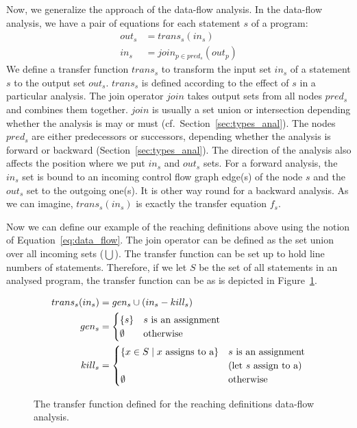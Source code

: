 Now, we generalize the approach of the data-flow analysis. In the data-flow
analysis, we have a pair of equations for each statement $s$ of a program:
\begin{equation} \label{eq:data_flow}
\begin{aligned}
out_s & = trans_s(in_s) \\
in_s & = join_{p\in pred_s}(out_p)
\end{aligned}
\end{equation}
We define a transfer function $trans_s$ to transform the input set $in_s$ of a
statement $s$ to the output set $out_s$. $trans_s$ is defined according to the
effect of $s$ in a particular analysis.  The join operator $join$ takes output
sets from all nodes $pred_s$ and combines them together. $join$ is usually a
set union or intersection depending whether the analysis is may or must (cf.\
Section~\ref{sec:types_anal}). The nodes $pred_s$ are either predecessors or
successors, depending whether the analysis is forward or backward
(Section~\ref{sec:types_anal}).  The direction of the analysis also affects
the position where we put $in_s$ and $out_s$ sets. For a forward analysis, the
$in_s$ set is bound to an incoming control flow graph edge(s) of the node $s$
and the $out_s$ set to the outgoing one(s). It is other way round for a
backward analysis. As we can imagine, $trans_s(in_s)$ is exactly the transfer
equation $f_s$.

Now we can define our example of the reaching definitions above using the
notion of Equation~\ref{eq:data_flow}. The join operator can be defined as the
set union over all incoming sets ($\bigcup$). The transfer function can be set
up to hold line numbers of statements. Therefore, if we let $S$ be the set of
all statements in an analysed program, the transfer function can be as is
depicted in Figure~\ref{fig:st_rdef_trans}.

\begin{figure}[tb]
\begin{align*}
trans_s(in_s) & = gen_s \cup (in_s - kill_s) \\
gen_s & =
\begin{cases}
\{s\}     & \text{$s$ is an assignment} \\
\emptyset & \text{otherwise}
\end{cases} \\
kill_s & =
\begin{cases}
\{x \in S \mid x \text{ assigns to \code{a}} \} & s \text{ is an assignment}
  \\
& \text{(let } s \text{ assign to \code{a})} \\
\emptyset & \text{otherwise}
\end{cases}
\end{align*}

  \caption{The transfer function defined for the reaching definitions
  data-flow analysis.}
  \label{fig:st_rdef_trans}
\end{figure}

